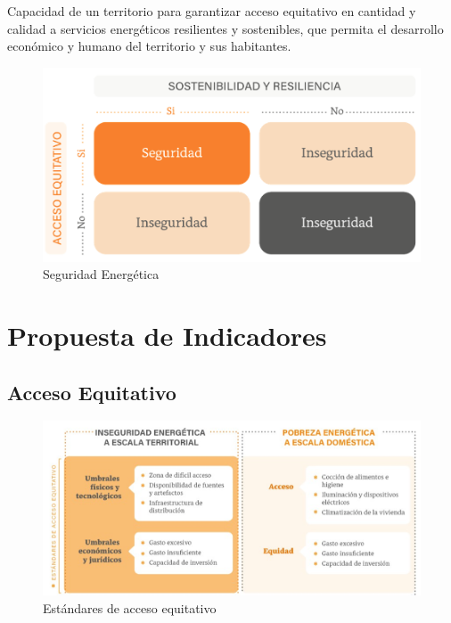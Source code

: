 \documentclass[
]{book}
\begin{document}
Capacidad de un territorio para garantizar acceso equitativo en cantidad y calidad a servicios energéticos resilientes y sostenibles, que permita el desarrollo económico y humano del territorio y sus habitantes. \citep{urquiza_water_2020}

\begin{figure}

{\centering \includegraphics[width=1\linewidth]{images/seguridad_ene} 

}

\caption{Seguridad Energética}\label{fig:unnamed-chunk-4}
\end{figure}

\hypertarget{propuesta-de-indicadores}{%
\section{Propuesta de Indicadores}\label{propuesta-de-indicadores}}

\hypertarget{acceso-equitativo}{%
\subsection{Acceso Equitativo}\label{acceso-equitativo}}

\begin{figure}

{\centering \includegraphics[width=1\linewidth]{images/a_equitativo} 

}

\caption{Estándares de acceso equitativo}\label{fig:unnamed-chunk-5}
\end{figure}
\end{document}
